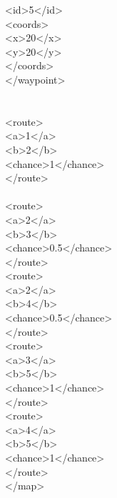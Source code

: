 \phantom{pina}\phantom{pina}<id>5</id>\\
\phantom{pina}\phantom{pina}<coords>\\
\phantom{pina}\phantom{pina}\phantom{pina}<x>20</x>\\
\phantom{pina}\phantom{pina}\phantom{pina}<y>20</y>\\
\phantom{pina}\phantom{pina}</coords>\\
\phantom{pina}</waypoint>\\
\\
\\
\phantom{pina}<route>\\
\phantom{pina}\phantom{pina}<a>1</a>\\
\phantom{pina}\phantom{pina}<b>2</b>\\
\phantom{pina}\phantom{pina}<chance>1</chance>\\
\phantom{pina}</route>\\
\phantom{pina}\\
\phantom{pina}<route>\\
\phantom{pina}\phantom{pina}<a>2</a>\\
\phantom{pina}\phantom{pina}<b>3</b>\\
\phantom{pina}\phantom{pina}<chance>0.5</chance>\\
\phantom{pina}</route>\\
\phantom{pina}<route>\\
\phantom{pina}\phantom{pina}<a>2</a>\\
\phantom{pina}\phantom{pina}<b>4</b>\\
\phantom{pina}\phantom{pina}<chance>0.5</chance>\\
\phantom{pina}</route>\\
\phantom{pina}<route>\\
\phantom{pina}\phantom{pina}<a>3</a>\\
\phantom{pina}\phantom{pina}<b>5</b>\\
\phantom{pina}\phantom{pina}<chance>1</chance>\\
\phantom{pina}</route>\\
\phantom{pina}<route>\\
\phantom{pina}\phantom{pina}<a>4</a>\\
\phantom{pina}\phantom{pina}<b>5</b>\\
\phantom{pina}\phantom{pina}<chance>1</chance>\\
\phantom{pina}</route>\\
</map>\\

